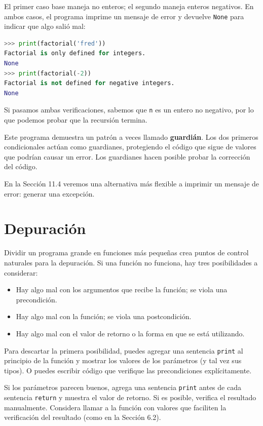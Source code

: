 El primer caso base maneja no enteros; el segundo maneja enteros negativos. En ambos casos, el programa imprime un mensaje de error y devuelve \texttt{None} para indicar que algo salió mal:

\begin{lstlisting}[language=Python]
>>> print(factorial('fred'))
Factorial is only defined for integers.
None
>>> print(factorial(-2))
Factorial is not defined for negative integers.
None
\end{lstlisting}

Si pasamos ambas verificaciones, sabemos que \texttt{n} es un entero no negativo, por lo que podemos probar que la recursión termina.

Este programa demuestra un patrón a veces llamado \textbf{guardián}. Los dos primeros condicionales actúan como guardianes, protegiendo el código que sigue de valores que podrían causar un error. Los guardianes hacen posible probar la corrección del código.

En la Sección 11.4 veremos una alternativa más flexible a imprimir un mensaje de error: generar una excepción.

\section{Depuración}

Dividir un programa grande en funciones más pequeñas crea puntos de control naturales para la depuración. Si una función no funciona, hay tres posibilidades a considerar:

\begin{itemize}
    \item Hay algo mal con los argumentos que recibe la función; se viola una precondición.
    \item Hay algo mal con la función; se viola una postcondición.
    \item Hay algo mal con el valor de retorno o la forma en que se está utilizando.
\end{itemize}

Para descartar la primera posibilidad, puedes agregar una sentencia \texttt{print} al principio de la función y mostrar los valores de los parámetros (y tal vez sus tipos). O puedes escribir código que verifique las precondiciones explícitamente.

Si los parámetros parecen buenos, agrega una sentencia \texttt{print} antes de cada sentencia \texttt{return} y muestra el valor de retorno. Si es posible, verifica el resultado manualmente. Considera llamar a la función con valores que faciliten la verificación del resultado (como en la Sección 6.2).

